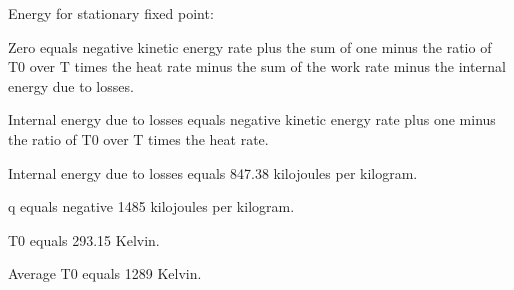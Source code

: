 Energy for stationary fixed point:

Zero equals negative kinetic energy rate plus the sum of one minus the ratio of T0 over T times the heat rate minus the sum of the work rate minus the internal energy due to losses.

Internal energy due to losses equals negative kinetic energy rate plus one minus the ratio of T0 over T times the heat rate.

Internal energy due to losses equals 847.38 kilojoules per kilogram.

q equals negative 1485 kilojoules per kilogram.

T0 equals 293.15 Kelvin.

Average T0 equals 1289 Kelvin.